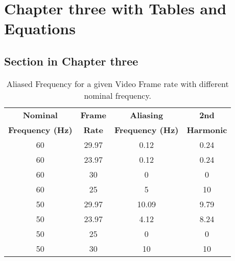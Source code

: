 \chapter{Chapter three with Tables and Equations}
\label{ch:chapter_three}
\section{Section in Chapter three}
\label{sec:label_here}


   
\begin{table} \small \sf

\begin{center}
\begin{tabular}{|c|c|c|c|}
\hline
\textbf{Nominal} & \textbf{Frame}& \textbf{Aliasing}& \textbf{2nd} \\
\textbf{Frequency (Hz)} & \textbf{Rate}& \textbf{Frequency (Hz)}& \textbf{Harmonic} \\
\hline
60& 29.97&0.12 &0.24  \\
\hline
60& 23.97&0.12 &0.24  \\
\hline
60& 30&0 &0  \\
\hline
60& 25&5 &10  \\
\hline
50& 29.97&10.09 &9.79  \\
\hline
50& 23.97&4.12 &8.24  \\
\hline
50& 25&0 &0  \\
\hline
50& 30&10 &10  \\
\hline
\end{tabular}
\caption{Aliased Frequency for a given Video Frame rate with different nominal frequency.}
\label{tab:ch3_table}
\end{center}
\vspace{-10 pt}
\end{table}

